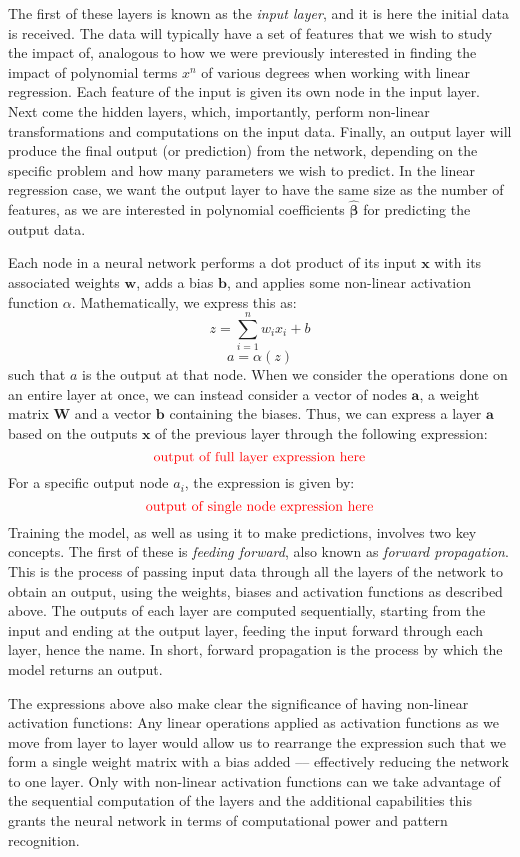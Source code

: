 The first of these layers is known as the \emph{input layer}, and it is here the initial data is received. The data will typically have a set of features that we wish to study the impact of, analogous to how we were previously interested in finding the impact of polynomial terms $x^n$ of various degrees when working with linear regression. Each feature of the input is given its own node in the input layer. Next come the hidden layers, which, importantly, perform non-linear transformations and computations on the input data. Finally, an output layer will produce the final output (or prediction) from the network, depending on the specific problem and how many parameters we wish to predict. In the linear regression case, we want the output layer to have the same size as the number of features, as we are interested in polynomial coefficients $\boldsymbol{\hat{\beta}}$ for predicting the output data. 

Each node in a neural network performs a dot product of its input $\boldsymbol{x}$ with its associated weights $\boldsymbol{w}$, adds a bias $\boldsymbol{b}$, and applies some non-linear activation function $\alpha$. Mathematically, we express this as:
\[ z = \sum_{i=1}^{n} w_i x_i + b \]
\[ a = \alpha(z) \]
such that $a$ is the output at that node. When we consider the operations done on an entire layer at once, we can instead consider a vector of nodes $\boldsymbol{a}$, a weight matrix $\mathbf{W}$ and a vector $\boldsymbol b$ containing the biases. Thus, we can express a layer $\boldsymbol a$ based on the outputs $\boldsymbol x$ of the previous layer through the following expression:
\[\text{\textcolor{red}{output of full layer expression here}}\]
For a specific output node $a_i$, the expression is given by:
\[\text{\textcolor{red}{output of single node expression here}}\]
Training the model, as well as using it to make predictions, involves two key concepts. The first of these is \emph{feeding forward}, also known as \emph{forward propagation}. This is the process of passing input data through all the layers of the network to obtain an output, using the weights, biases and activation functions as described above. The outputs of each layer are computed sequentially, starting from the input and ending at the output layer, feeding the input forward through each layer, hence the name. In short, forward propagation is the process by which the model returns an output.

The expressions above also make clear the significance of having non-linear activation functions: Any linear operations applied as activation functions as we move from layer to layer would allow us to rearrange the expression such that we form a single weight matrix with a bias added –– effectively reducing the network to one layer. Only with non-linear activation functions can we take advantage of the sequential computation of the layers and the additional capabilities this grants the neural network in terms of computational power and pattern recognition.

